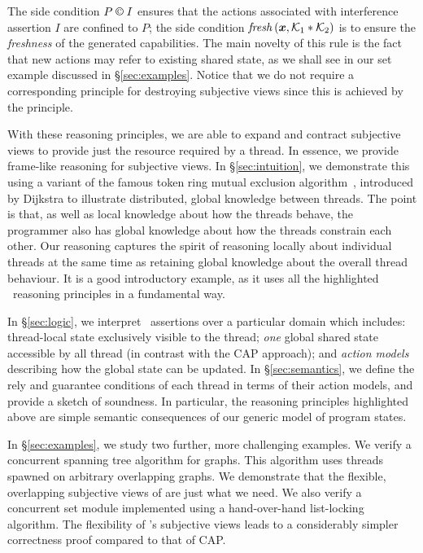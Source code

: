 The side condition $P \containI I$ ensures that the actions associated with interference assertion $I$ are confined to $P$; the side condition $\fresh{\vec{x}, \capAss{1} * \capAss{2}}$ is to ensure the \emph{freshness} of the generated capabilities. 
The main novelty of this rule is the fact that new actions may refer to existing shared state, as we shall see  in our set example discussed in \S\ref{sec:examples}. Notice that we do not require a corresponding principle for destroying subjective views since this is achieved by the \forgetRule principle. 

With these reasoning principles, we are able to expand and contract subjective views  to provide just the resource required by a thread.
In essence, we provide  frame-like reasoning for  subjective  views. 
In \S\ref{sec:intuition}, we demonstrate this using a variant of the famous  token ring mutual exclusion algorithm~\cite{dijkstra74}, introduced by Dijkstra to illustrate distributed, global knowledge between threads. The point is that, as well as local knowledge about how the threads behave, the programmer also has global knowledge about how the threads constrain each other. Our reasoning captures the spirit of reasoning locally about individual threads at the same time as retaining global knowledge about the overall thread behaviour. It is a good  introductory example, as it uses all the highlighted \colosl\ reasoning principles in a fundamental way. 

In \S\ref{sec:logic}, we interpret \colosl\ assertions over a particular domain which includes: thread-local state exclusively visible to the thread; {\em one} global shared state accessible by all thread (in contrast with the CAP approach); and {\em action models} describing how the global state can be updated. In \S\ref{sec:semantics}, we define the rely and guarantee conditions of each thread in terms of their action models, and provide a sketch of soundness. In particular, the reasoning principles highlighted above are simple semantic
consequences of our generic model of program states.  


In \S\ref{sec:examples}, we study two further, more challenging examples. We verify a concurrent spanning tree algorithm for graphs. This algorithm uses threads spawned on arbitrary overlapping graphs. We demonstrate that the flexible, overlapping subjective views of \colosl are just what we need.  We also verify a concurrent set
module implemented using a hand-over-hand list-locking algorithm.
The flexibility of \colosl's subjective views leads to a considerably simpler correctness proof compared to that of CAP. 


